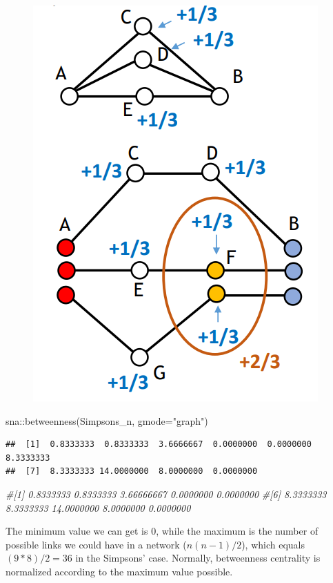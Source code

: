 \documentclass[
  notitlepage,
  onecolumn,
  openany]{book}
\newenvironment{Shaded}{\begin{snugshade}}{\end{snugshade}}
\newcommand{\AttributeTok}[1]{\textcolor[rgb]{0.77,0.63,0.00}{#1}}
\newcommand{\CommentTok}[1]{\textcolor[rgb]{0.56,0.35,0.01}{\textit{#1}}}
\newcommand{\FunctionTok}[1]{\textcolor[rgb]{0.00,0.00,0.00}{#1}}
\newcommand{\NormalTok}[1]{#1}
\newcommand{\SpecialCharTok}[1]{\textcolor[rgb]{0.00,0.00,0.00}{#1}}
\newcommand{\StringTok}[1]{\textcolor[rgb]{0.31,0.60,0.02}{#1}}
\begin{document}
\begin{figure}[h!]

{\centering \includegraphics[width=0.5\linewidth]{images/04-Centrality/Untitled 6} 

}

\end{figure}

\begin{Shaded}
\begin{Highlighting}[]
\NormalTok{sna}\SpecialCharTok{::}\FunctionTok{betweenness}\NormalTok{(Simpsons\_n, }\AttributeTok{gmode=}\StringTok{"graph"}\NormalTok{)}
\end{Highlighting}
\end{Shaded}

\begin{verbatim}
##  [1]  0.8333333  0.8333333  3.6666667  0.0000000  0.0000000  8.3333333
##  [7]  8.3333333 14.0000000  8.0000000  0.0000000
\end{verbatim}

\begin{Shaded}
\begin{Highlighting}[]
\CommentTok{\#[1] 0.8333333 0.8333333 3.66666667 0.0000000 0.0000000}
\CommentTok{\#[6] 8.3333333 8.3333333 14.0000000 8.0000000 0.0000000}
\end{Highlighting}
\end{Shaded}

The minimum value we can get is 0, while the maximum is the number of possible links we could have in a network (\(n(n-1)/2\)), which equals \((9*8)/2 = 36\) in the Simpsons' case. Normally, betweenness centrality is normalized according to the maximum value possible.
\end{document}
